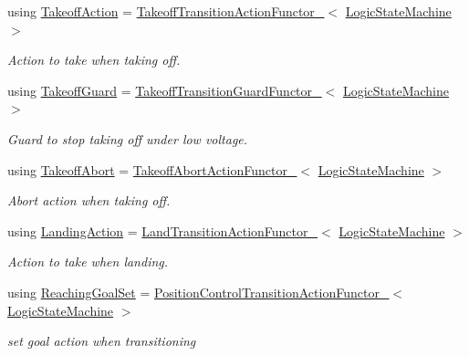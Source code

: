 \begin{DoxyCompactItemize}
using \hyperlink{classLogicStateMachineFrontEnd_af73bbbe19d413f3786c265fe91a94ffb}{Takeoff\-Action} = \hyperlink{structTakeoffTransitionActionFunctor__}{Takeoff\-Transition\-Action\-Functor\-\_\-}$<$ \hyperlink{basic__state__machine_8h_ab0b6ef21baf57684550a2f05c771bd86}{Logic\-State\-Machine} $>$
\begin{DoxyCompactList}\small\item\em Action to take when taking off. \end{DoxyCompactList}\item 
using \hyperlink{classLogicStateMachineFrontEnd_a4660e7e7dbd8bc3f7a379a076999187d}{Takeoff\-Guard} = \hyperlink{structTakeoffTransitionGuardFunctor__}{Takeoff\-Transition\-Guard\-Functor\-\_\-}$<$ \hyperlink{basic__state__machine_8h_ab0b6ef21baf57684550a2f05c771bd86}{Logic\-State\-Machine} $>$
\begin{DoxyCompactList}\small\item\em Guard to stop taking off under low voltage. \end{DoxyCompactList}\item 
using \hyperlink{classLogicStateMachineFrontEnd_a26036773cac59b48b9e545acc870a29b}{Takeoff\-Abort} = \hyperlink{structTakeoffAbortActionFunctor__}{Takeoff\-Abort\-Action\-Functor\-\_\-}$<$ \hyperlink{basic__state__machine_8h_ab0b6ef21baf57684550a2f05c771bd86}{Logic\-State\-Machine} $>$
\begin{DoxyCompactList}\small\item\em Abort action when taking off. \end{DoxyCompactList}\item 
using \hyperlink{classLogicStateMachineFrontEnd_ad1619c7d43a216eb9238004470389f2e}{Landing\-Action} = \hyperlink{structLandTransitionActionFunctor__}{Land\-Transition\-Action\-Functor\-\_\-}$<$ \hyperlink{basic__state__machine_8h_ab0b6ef21baf57684550a2f05c771bd86}{Logic\-State\-Machine} $>$
\begin{DoxyCompactList}\small\item\em Action to take when landing. \end{DoxyCompactList}\item 
using \hyperlink{classLogicStateMachineFrontEnd_a39babee29ba680422ea922504a465417}{Reaching\-Goal\-Set} = \hyperlink{structPositionControlTransitionActionFunctor__}{Position\-Control\-Transition\-Action\-Functor\-\_\-}$<$ \hyperlink{basic__state__machine_8h_ab0b6ef21baf57684550a2f05c771bd86}{Logic\-State\-Machine} $>$
\begin{DoxyCompactList}\small\item\em set goal action when transitioning \end{DoxyCompactList}\item 

\end{DoxyCompactItemize}
